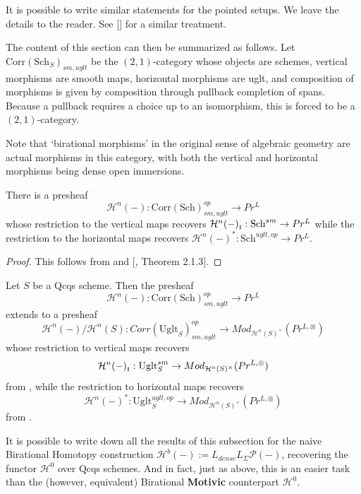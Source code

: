 It is possible to write similar statements for the pointed setups. We leave the details to the reader. See [\cite{khan2016motivic}] for a similar treatment. 

The content of this section can then be summarized as follows. Let $\mathrm{Corr}(\mathrm{Sch}_S)_{ sm,uglt}$ be the $(2,1)$-category whose objects are schemes, vertical morphisms are smooth maps, horizontal morphisms are uglt, and composition of morphisms is given by composition through pullback completion of spans. Because a pullback requires a choice up to an isomorphism, this is forced to be a $(2,1)$-category.

\begin{rem}
Note that `birational morphisms' in the original sense of algebraic geometry are actual morphisms in this category, with both the vertical and horizontal morphisms being dense open immersions.
\end{rem}

\begin{thm}\label{full functoriality}
    There is  a presheaf $$\mathcal{H}^n(-): \mathrm{Corr}
    (\mathrm{Sch})_{sm,uglt}^{op}\to Pr^L$$ whose restriction to the vertical maps recovers $\mathcal{H}^n(-)_{\mathord{\text{\tiny $\sharp$}}}: \mathrm{Sch}^{sm}\to Pr^L$ while the restriction to the horizontal maps recovers $\mathcal{H}^{n}(-)^*: \mathrm{Sch}^{uglt,op}_{}\to Pr^L$.
\end{thm}
\begin{proof}
This follows from  and [\cite{MR3701352}, Theorem 2.1.3].
\end{proof}
\begin{cor}
Let $S$ be a Qcqs scheme. Then the presheaf $$\mathcal{H}^n(-):\mathrm{Corr}(\mathrm{Sch})_{sm,uglt}^{op}\to Pr^L$$ extends to 
 a presheaf $$\mathcal{H}^n(-)/\mathcal{H}^n(S):Corr(\mathrm{Uglt}_S)_{sm,uglt}^{op}\to Mod_{\mathcal{H}^n(S)^\times}(Pr^{L,\otimes})$$ whose restriction to vertical maps recovers $$\mathcal{H}^n(-)_{\mathord{\text{\tiny $\sharp$}}}: \mathrm{Uglt}_S^{sm}\to Mod_{\mathcal{H}^n(S)^\times}(Pr^{L,\otimes})$$ from , while the restriction to horizontal maps recovers $$\mathcal{H}^{n}(-)^*: \mathrm{Uglt}^{uglt,op}_{S}\to Mod_{\mathcal{H}^n(S)^\times}(Pr^{L,\otimes})$$ from .
\end{cor}


\begin{rem}
       It is possible to write down all the results of this subsection for the naive Birational Homotopy construction $\mathcal{H}^b(-):=L_{dense}L_\Sigma\mathcal{P}(-)$, recovering the functor $\mathcal{H}^{0}$ over Qcqs schemes. And in fact, just as above, this is an easier task than the (however, equivalent) Birational \textbf{Motivic} counterpart $\mathcal{H}^{0}$.
\end{rem}
